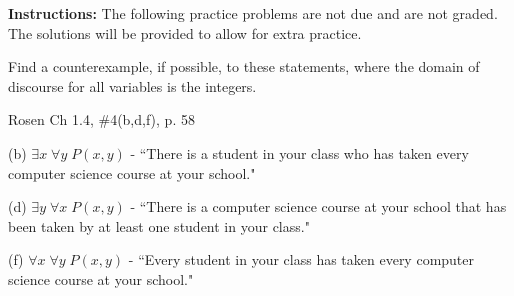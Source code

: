 \documentclass[12pt]{exam}
\newenvironment{my_parts}{
\begin{parts}
    \setlength{\itemsep}{1pt}
    \setlength{\parskip}{0pt}
    \setlength{\parsep}{0pt}
}{\end{parts}}
\newenvironment{my_item}{
\begin{itemize}
    \setlength{\itemsep}{1pt}
    \setlength{\parskip}{0pt}
    \setlength{\parsep}{0pt}
}{\end{itemize}}
\begin{document}
\extrawidth{0.5in} \extrafootheight{-0.75in} \pagestyle{headandfoot}
\headrule {} \footrule {}

\noindent \textbf{Instructions:} The following practice problems are
not due and are not graded.  The solutions will be provided to allow
for extra practice.


\begin{questions}

\printanswers

\question Find a counterexample, if possible, to these statements,
where the domain of discourse for all variables is the integers.
    \begin{solution}
    \end{solution}

\question Rosen Ch 1.4, \#4(b,d,f), p. 58
    \begin{solution}
    \begin{my_item}
        \item[(b)] $\exists x\; \forall y\; P(x,y)$ - ``There is a
        student in your class who has taken every computer science
        course at your school."
        \item[(d)] $\exists y\; \forall x\; P(x,y)$ - ``There is a
        computer science course at your school that has been taken
        by at least one student in your class."
        \item[(f)] $\forall x\; \forall y\; P(x,y)$ - ``Every
        student in your class has taken every computer science
        course at your school."
    \end{my_item}
    \end{solution}


\end{questions}
\end{document}
